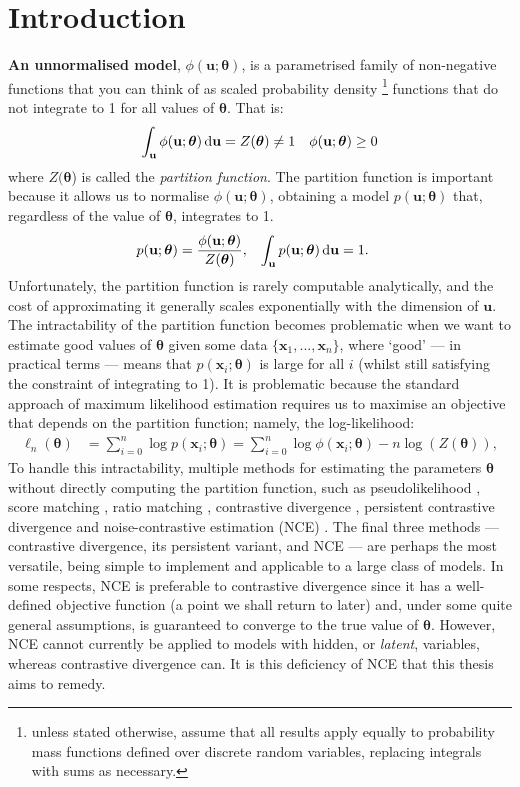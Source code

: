 \documentclass[11pt, oneside]{article}
\newcommand{\thetab}{{\boldsymbol{\theta}}}
\newcommand{\pnorm}{p}
\newcommand{\pnn}{\phi}
\renewcommand{\u}{{\mathbf u}}
\newcommand{\x}{{\mathbf x}}
\theoremstyle{definition}
\begin{document}
\section{Introduction}
\textbf{An unnormalised model}, $\pnn(\u;\thetab)$, is a parametrised family of non-negative functions that you can think of as scaled probability density \footnote{unless stated otherwise, assume that all results apply equally to probability mass functions defined over discrete random variables, replacing integrals with sums as necessary.} functions that do not integrate to 1 for all values of $\thetab$. That is:
 \begin{align}
   \int_{\u }\pnn(\u;\thetab) \dif \u &= Z(\thetab) \neq 1 & \pnn(\u;\thetab) \geq 0
\label{eq:Zdef}
  \end{align}
where $Z(\thetab$) is called the \emph{partition function}. The partition function is important because it allows us to normalise $\pnn(\u;\thetab)$, obtaining a model $\pnorm(\u; \thetab)$ that, regardless of the value of $\thetab$, integrates to 1.
\begin{align}
  \pnorm(\u;\thetab)&=\frac{\pnn(\u;\thetab)}{Z(\thetab)}, & \int_{\u }\pnorm(\u;\thetab) \dif\u & = 1.
  \label{unnormalised density}
\end{align}
Unfortunately, the partition function is rarely computable analytically, and the cost of approximating it generally scales exponentially with the dimension of $\u$. The intractability of the partition function becomes problematic when we want to estimate good values of $\thetab$ given some data $\{\x_1, ..., \x_n\}$, where `good' --- in practical terms --- means that  $\pnorm(\x_i; \thetab)$ is large for all $i$ (whilst still satisfying the constraint of integrating to 1). It is problematic because the standard approach of maximum likelihood estimation requires us to maximise an objective that depends on the partition function; namely, the log-likelihood:
\begin{align}
\ell_n(\thetab) &= \sum_{i=0}^{n}  \log \pnorm(\x_i;\thetab) = \sum_{i=0}^{n}  \log \pnn(\x_i;\thetab) - n \log ( Z(\thetab) ),
\label{eq:log-likelihood}
\end{align}
To handle this intractability, multiple methods for estimating the parameters $\thetab$ without directly computing the partition function, such as pseudolikelihood \citep{besag1975statistical}, score matching \citep{hyvarinen2005estimation}, ratio matching \citep{hyvarinen2007some}, contrastive divergence \citep{hinton2006training}, persistent contrastive divergence \citep{younes1998stochastic, tieleman2009using} and noise-contrastive estimation (NCE) \citep{gutmann2012noise}. The final three methods --- contrastive divergence, its persistent variant, and NCE --- are perhaps the most versatile, being simple to implement and applicable to a large class of models. In some respects, NCE is preferable to contrastive divergence since it has a well-defined objective function (a point we shall return to later) and, under some quite general assumptions, is guaranteed to converge to the true value of $\thetab$. However, NCE cannot currently be applied to models with hidden, or \emph{latent}, variables, whereas contrastive divergence can. It is this deficiency of NCE that this thesis aims to remedy.
\end{document}
